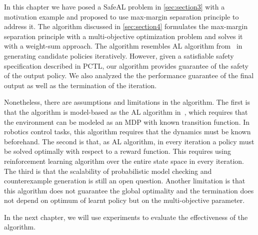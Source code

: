 In this chapter we have posed a SafeAL problem in \ref{sec:section3} with a motivation example and proposed to use max-margin separation principle to address it. The algorithm discussed in \ref{sec:section4} formulates the max-margin separation principle with a  multi-objective optimization problem and solves it with a weight-sum approach. The algorithm resembles AL algorithm from~\cite{Abbeel:2004:ALV:1015330.1015430} in generating candidate policies iteratively. However, given a satisfiable safety specification described in PCTL, our algorithm provides guarantee of the safety of the output policy. We also analyzed the the performance guarantee of the final output as well as the termination of the iteration.

Nonetheless, there are assumptions and limitations in the algorithm. The first is that the algorithm is model-based as the AL algorithm in~\cite{Abbeel:2004:ALV:1015330.1015430}, which requires that the environment can be modeled as an MDP with known transition function. In robotics control tasks, this algorithm requires that the dynamics must be known beforehand. The second is that, as AL algorithm, in every iteration a policy must be solved optimally with respect to a reward function. This requires using reinforcement learning algorithm over the entire state space in every iteration. The third is that the scalability of probabilistic model checking and counterexample generation is still an open question. Another limitation is that this algorithm does not guarantee the global optimality and the termination does not depend on optimum of learnt policy but on the multi-objective parameter. 

In the next chapter, we will use experiments to evaluate the effectiveness of the algorithm.